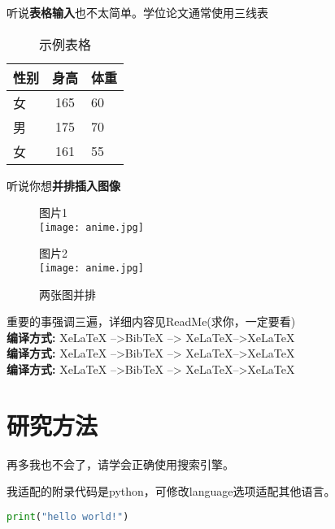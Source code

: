 \documentclass[AutoFakeBold]{fdureport}
\begin{document}
\par 听说\textbf{表格输入}也不太简单。学位论文通常使用三线表
\begin{table}[htbp] 
	\centering	
	\begin{tabular}{lcl} 
		\toprule 
		性别 & 身高 & 体重 \\ 
		\midrule 
		 女 & 165 & 60 \\ 
	     男 & 175 & 70 \\ 
		 女 & 161 & 55 \\ 
		\bottomrule 
	\end{tabular} 
\caption{\label{tab:test}示例表格} 
\end{table}
\par 听说你想\textbf{并排插入图像}
\begin{figure}[H]
	\begin{minipage}[t]{0.5\textwidth}
	\centering
	\tiny 图片1 \\
	\vspace{0.5cm}
	\texttt{[image: anime.jpg]}
\end{minipage}
\begin{minipage}[t]{0.5\textwidth}
	\centering 
	\tiny 图片2 \\
	\vspace{0.5cm}
	\texttt{[image: anime.jpg]}  
\end{minipage}	
\protect\caption{两张图并排 \label {fig:two-pics}}	
\end{figure}

\par 重要的事强调三遍，详细内容见ReadMe(求你，一定要看) \\
{\bfseries 编译方式:} XeLaTeX -->BibTeX --> XeLaTeX-->XeLaTeX \\
{\bfseries 编译方式:} XeLaTeX -->BibTeX --> XeLaTeX-->XeLaTeX \\
{\bfseries 编译方式:} XeLaTeX -->BibTeX --> XeLaTeX-->XeLaTeX
\chapter{研究方法}
\par 再多我也不会了，请学会正确使用搜索引擎。
\par 我适配的附录代码是python，可修改language选项适配其他语言。

\begin{lstlisting}[language = python]
print("hello world!")

\end{lstlisting}
\end{document}
